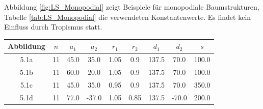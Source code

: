 Abbildung \ref{fig:LS_Monopodial} zeigt Beispiele für monopodiale Baumstrukturen, Tabelle \ref{tab:LS_Monopodial} die verwendeten Konstantenwerte. Es findet kein Einfluss durch Tropismus statt.
\begin{center}
	\begin{tabulary}{\textwidth}{|C|C|C|C|C|C|C|C|C|}
		\hline 
		Abbildung & $n$ & $a_1$ & $a_2$ & $r_1$ & $r_2$ & $d_1$ & $d_2$ & $s$ \\ 
		\hline 
		5.1a & 11 & 45.0 & 35.0 & 1.05 & 0.9 & 137.5 & 70.0 & 100.0 \\ 
		\hline 
		5.1b & 11 & 60.0 & 20.0 & 1.05 & 0.9 & 137.5 & 70.0 & 100.0 \\ 
		\hline 
		5.1c & 11 & 45.0 & 35.0 & 0.95 & 0.9 & 137.5 & 70.0 & 350.0 \\ 
		\hline 
		5.1d & 11 & 77.0 & -37.0 & 1.05 & 0.85 & 137.5 & -70.0 & 200.0 \\ 
		\hline 
	\end{tabulary} 
	\label{tab:LS_Monopodial}
\end{center}


